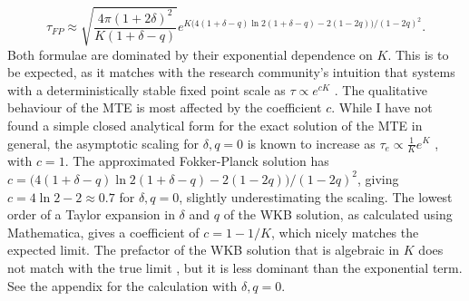 \begin{equation}
 \tau_{FP} \approx \sqrt{\frac{4\pi(1+2\delta)^2}{K(1+\delta-q)}} e^{ K\big( 4(1+\delta-q)\ln 2(1+\delta-q) - 2(1-2q) \big)/(1-2q)^2 }. %
\end{equation}
Both formulae are dominated by their exponential dependence on $K$. 
This is to be expected, as it matches with the research community's intuition that systems with a deterministically stable fixed point scale as $\tau \propto e^{cK}$ \cite{Leigh1981,Lande1993,Kamenev2008,Cremer2009a,Dobrinevski2012,Yu2017}. 
The qualitative behaviour of the MTE is most affected by the coefficient $c$. %
While I have not found a simple closed analytical form for the exact solution of the MTE in general, the asymptotic scaling for $\delta,q = 0$ is known to increase as $\tau_e \propto \frac{1}{K}e^K$ \cite{Lande1993,Lambert2005}, with $c=1$. 
The approximated Fokker-Planck solution has $c=\big( 4(1+\delta-q)\ln 2(1+\delta-q) - 2(1-2q) \big)/(1-2q)^2$, giving $c=4\ln2-2\approx 0.7$ for $\delta,q = 0$, slightly underestimating the scaling. 
The lowest order of a Taylor expansion in $\delta$ and $q$ of the WKB solution, as calculated using Mathematica, gives a coefficient of $c=1-1/K$, which nicely matches the expected limit. 
The prefactor of the WKB solution that is algebraic in $K$ does not match with the true limit \cite{Assaf2010,Badali2019a,Badali2019b}, but it is less dominant than the exponential term. %
See the appendix for the calculation with $\delta,q = 0$. 
